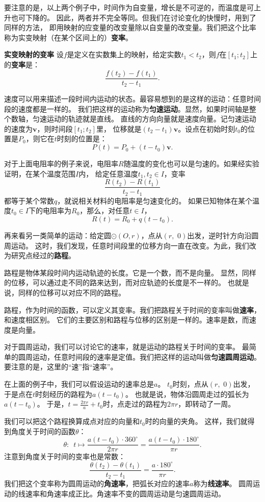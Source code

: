 \documentclass[12pt,UTF8]{ctexbook}
\begin{document}
要注意的是，以上两个例子中，时间作为自变量，增长是不可逆的，而温度是可上升也可下降的。
因此，两者并不完全等同。但我们在讨论变化的快慢时，用到了同样的方法，
即用映射的应变量的改变量除以自变量的改变量。我们把这个比率称为实变映射（在某个区间上的）\textbf{变率}。

\begin{df}{\textbf{实变映射的变率}}
    设$f$是定义在实数集上的映射，给定实数$t_1 < t_2$，则$f$在$[t_1;t_2]$上的\textbf{变率}是：
    $$ \frac{f(t_2) - f(t_1)}{t_2 - t_1}.$$
\end{df}

速度可以用来描述一段时间内运动的状态。最容易想到的是这样的运动：任意时间段的速度都是一样的。
我们把这样的运动称为\textbf{匀速运动}。显然，如果时间轴是整个数轴，匀速运动的轨迹就是直线。
直线的方向向量就是速度向量。记匀速运动的速度为$\mathbf{v}$，则时间段$[t_1;t_2]$里，
位移就是$(t_2 - t_1)\mathbf{v}$。设点在初始时刻$t_0$的位置是$P_0$，则它在$t$时刻的位置是：
$$P(t) = P_0 + (t - t_0)\mathbf{v}.$$

对于上面电阻率的例子来说，电阻率$R$随温度的变化也可以是匀速的。如果经实验证明，在某个温度范围$I$内，
给定任意温度$t_1, t_2 \in I$，变率
$$ \frac{R(t_2) - R(t_1)}{t_2 - t_1} $$
都等于某个常数$q$，就说相关材料的电阻率是匀速变化的。
如果已知物体在某个温度$t_0\in I$下的电阻率为$R_0$，那么，对任意$t\in I$，
$$ R(t) = R_0 + q(t - t_0). $$

再来看另一类简单的运动：给定圆$\odot(O, r)$，点从$(r,\,\, 0)$出发，逆时针方向沿圆周运动。
这时，我们发现，任意时间段里的位移方向一直在改变。为此，我们改为研究点经过的\textbf{路程}。

路程是物体某段时间内运动轨迹的长度。它是一个数，而不是向量。
显然，同样的位移，可以通过走不同的路来达到，而对应轨迹的长度是不一样的。
也就是说，同样的位移可以对应不同的路程。

路程，作为时间的函数，可以定义其变率。我们把路程关于时间的变率叫做\textbf{速率}，和速度相区别。
它们的主要区别和路程与位移的区别是一样的。速率是数，而速度是向量。

对于圆周运动，我们可以讨论它的速率，就是运动的路程关于时间的变率。
最简单的圆周运动，任意时间段的速率是定值。我们把这样的运动叫做\textbf{匀速圆周运动}。
要注意的是，这里的“速”指“速率”。

在上面的例子中，我们可以假设运动的速率总是$a$。
$t_0$时刻，点从$(r,\,\, 0)$出发，于是点在$t$时刻经历的路程为$a(t - t_0)$。
也就是说，物体沿圆周走过的弧长为$a(t - t_0)$。
于是，$t = \frac{2\pi r}{a} + t_0$时，点走过的路程为$2\pi r$，即转动了一周。

我们可以把这个路程换算成点对应的向量和$t_0$时的向量的夹角。
这样，我们就得到角度关于时间的函数$\theta$：
$$ \theta : \,\,\, t \mapsto \frac{a(t - t_0)\cdot 360^\circ}{2\pi r} = \frac{a(t - t_0)\cdot 180^\circ}{\pi r}.$$
注意到角度关于时间的变率也是常数：
$$ \frac{\theta(t_2) - \theta(t_1)}{t_2 - t_1} = \frac{a \cdot 180^\circ}{\pi r}.$$
我们把这个变率称为圆周运动的\textbf{角速率}，把弧长对应的速率$a$称为\textbf{线速率}。
圆周运动的线速率和角速率成正比。角速率不变的圆周运动是匀速圆周运动。
\end{document}
